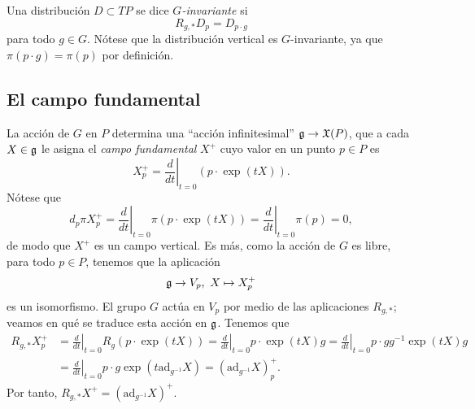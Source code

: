 \documentclass[11pt,a4paper]{amsbook}
\theoremstyle{remark} \newtheorem{rmk}[subsection]{Observación}
\theoremstyle{definition} \newtheorem{defn}[subsection]{Definición}
\theoremstyle{definition} \newtheorem{ex}[subsection]{Ejemplo}
\theoremstyle{definition} \newtheorem{ej}[subsection]{Ejercicio}
\begin{document}
\subsection{} Una distribución $D\subset TP$ se dice \emph{$G$-invariante} si
\begin{equation*}
R_{g,*} D_p = D_{p\cdot g}
\end{equation*}
para todo $g\in G$. Nótese que la distribución vertical es $G$-invariante, ya que $\pi(p\cdot g) = \pi(p)$ por definición.

\subsection{El campo fundamental} La acción de $G$ en $P$ determina una ``acción infinitesimal'' $\mathfrak{g} \rightarrow \mathfrak X(P)$, que a cada $X\in \mathfrak{g}$ le asigna el \emph{campo fundamental} $X^+$ cuyo valor en un punto $p\in P$ es
\begin{equation*}
X^+_p = \left. \frac{d}{dt} \right|_{t=0} (p \cdot \exp(tX)).
\end{equation*}
Nótese que
\begin{equation*}
d_p\pi X^+_p =\left. \frac{d}{dt} \right|_{t=0} \pi(p\cdot \exp(tX)) =  \left. \frac{d}{dt} \right|_{t=0} \pi(p) = 0,
\end{equation*}
de modo que $X^+$ es un campo vertical. Es más, como la acción de $G$ es libre, para todo $p\in P$, tenemos que la aplicación
\begin{equation*}
\mathfrak{g} \rightarrow V_p, \ X \mapsto X^+_p
\end{equation*}
es un isomorfismo. El grupo $G$ actúa en $V_p$ por medio de las aplicaciones $R_{g,*}$; veamos en qué se traduce esta acción en $\mathfrak{g}$. Tenemos que
\begin{align*}
R_{g,*} X^+_p &= \left. \frac{d}{dt} \right|_{t=0} R_g(p\cdot \exp(tX)) =  \left. \frac{d}{dt} \right|_{t=0} p\cdot \exp(tX)g =  \left. \frac{d}{dt} \right|_{t=0} p\cdot g g^{-1} \exp(tX)g \\
  &=  \left. \frac{d}{dt} \right|_{t=0} p\cdot g \exp(t\mathrm{ad}_{g^{-1}}X) = (\mathrm{ad}_{g^{-1}}X)^+_p.
\end{align*}
Por tanto, $R_{g,*}X^+= (\mathrm{ad}_{g^{-1}}X)^+$.
\end{document}

